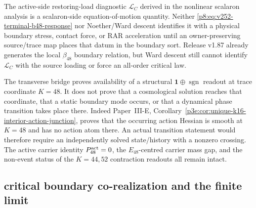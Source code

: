 \documentclass[12pt,a4paper]{article}
\begin{document}
\begin{corollary}
\label{p8:cor:v252-terminal-load-boundary-firewall}
The active-side restoring-load diagnostic \(\mathcal L_C\) derived in the
nonlinear scalaron analysis is a scalaron-side equation-of-motion quantity.
Neither \eqref{p8:eq:v252-terminal-b48-response} nor Noether/Ward descent
identifies it with a physical boundary stress, contact force, or RAR
acceleration until an owner-preserving source/trace map places that datum in
the boundary sort.  Release v1.87 already generates the local
\(\beta_{48}\) boundary relation, but Ward descent still cannot identify
\(\mathcal L_C\) with the source loading or force an all-order critical law.
\end{corollary}

\begin{corollary}[No \(K=48\) transition theorem from the structural bridge]
\label{p8:cor:v166-no-k48-transition-from-bridge}
The transverse bridge proves availability of a structural
\(\mathbf1\oplus\operatorname{sgn}\) readout at trace coordinate \(K=48\).
It does not prove that a cosmological solution reaches that coordinate, that
a static boundary mode occurs, or that a dynamical phase transition takes
place there.  Indeed Paper~III-E,
Corollary~\ref{p3e:cor:unique-k16-interior-action-junction}, proves that the
occurring action Hessian is smooth at \(K=48\) and has no action atom there.
An actual transition statement would therefore require an independently
solved state/history with a nonzero crossing.  The active carrier identity
\(P_{48}^{\rm act}=0\), the \(E_{48}\)-centred carrier mass gap, and the
non-event status of the \(K=44,52\) contraction readouts all remain intact.
\end{corollary}

\subsection{critical boundary co-realization and the finite limit}
\label{p8:sec:v167-critical-boundary-corealization}
\end{document}
